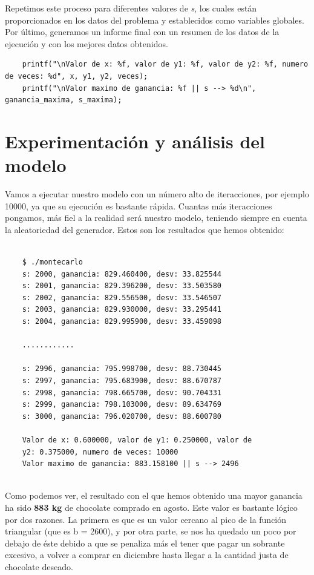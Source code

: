 \documentclass[11pt,a4paper]{article}
\begin{document}
Repetimos este proceso para diferentes valores de \textit{s}, los cuales están proporcionados en los datos del problema y establecidos como variables
globales. Por último, generamos un informe final con un resumen de los datos de la ejecución y con los mejores datos obtenidos.
\begin{lstlisting}
	printf("\nValor de x: %f, valor de y1: %f, valor de y2: %f, numero de veces: %d", x, y1, y2, veces);
	printf("\nValor maximo de ganancia: %f || s --> %d\n", ganancia_maxima, s_maxima);
\end{lstlisting}


\newpage
\section{Experimentación y análisis del modelo}

Vamos a ejecutar nuestro modelo con un número alto de iteracciones, por ejemplo 10000, ya que su ejecución es bastante rápida. Cuantas más iteracciones
pongamos, más fiel a la realidad será nuestro modelo, teniendo siempre en cuenta la aleatoriedad del generador. Estos son los resultados que hemos
obtenido:
\begin{lstlisting}

	$ ./montecarlo
	s: 2000, ganancia: 829.460400, desv: 33.825544
	s: 2001, ganancia: 829.396200, desv: 33.503580
	s: 2002, ganancia: 829.556500, desv: 33.546507
	s: 2003, ganancia: 829.930000, desv: 33.295441
	s: 2004, ganancia: 829.995900, desv: 33.459098

	............

	s: 2996, ganancia: 795.998700, desv: 88.730445
	s: 2997, ganancia: 795.683900, desv: 88.670787
	s: 2998, ganancia: 798.665700, desv: 90.704331
	s: 2999, ganancia: 798.103000, desv: 89.634769
	s: 3000, ganancia: 796.020700, desv: 88.600780

	Valor de x: 0.600000, valor de y1: 0.250000, valor de
	y2: 0.375000, numero de veces: 10000
	Valor maximo de ganancia: 883.158100 || s --> 2496
	
\end{lstlisting}

Como podemos ver, el resultado con el que hemos obtenido una mayor ganancia ha sido \textbf{883 kg} de chocolate comprado en agosto. Este valor es
bastante lógico por dos razones. La primera es que es un valor cercano al pico de la función triangular (que es b = 2600), y por otra parte, se nos ha
quedado un poco por debajo de éste debido a que se penaliza más el tener que pagar un sobrante excesivo, a volver a comprar en diciembre hasta llegar a
la cantidad justa de chocolate deseado.
\end{document}
